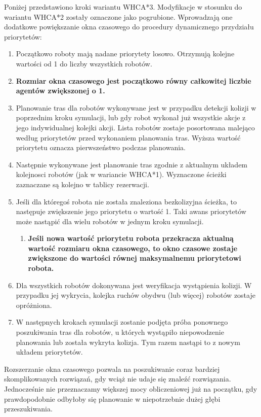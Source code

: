 Poniżej przedstawiono kroki wariantu WHCA*3. Modyfikacje w stosunku do wariantu WHCA*2 zostały oznaczone jako pogrubione. Wprowadzają one dodatkowe powiększanie okna czasowego do procedury dynamicznego przydziału priorytetów:
\begin{enumerate}
	\item Początkowo roboty mają nadane priorytety losowo. Otrzymują kolejne wartości od 1 do liczby wszystkich robotów.
	\item {\bf Rozmiar okna czasowego jest początkowo równy całkowitej liczbie agentów zwiększonej o 1.}
	\item Planowanie tras dla robotów wykonywane jest w przypadku detekcji kolizji w poprzednim kroku symulacji, lub gdy robot wykonał już wszystkie akcje z jego indywidualnej kolejki akcji.
	Lista robotów zostaje posortowana malejąco według priorytetów przed wykonaniem planowania tras. Wyższa wartość priorytetu oznacza pierwszeństwo podczas planowania.
	\item Następnie wykonywane jest planowanie tras zgodnie z aktualnym układem kolejnosci robotów (jak w wariancie WHCA*1). Wyznaczone ścieżki zaznaczane są kolejno w tablicy rezerwacji.
	\item Jeśli dla któregoś robota nie została znaleziona bezkolizyjna ścieżka, to następuje zwiększenie jego priorytetu o wartość 1. Taki awans priorytetów może nastąpić dla wielu robotów w jednym kroku symulacji.
	\begin{enumerate}
		\item {\bf Jeśli nowa wartość priorytetu robota przekracza aktualną wartość rozmiaru okna czasowego, to okno czasowe zostaje zwiększone do wartości równej maksymalnemu priorytetowi robota.}
	\end{enumerate}
	\item Dla wszystkich robotów dokonywana jest weryfikacja wystąpienia kolizji. W przypadku jej wykrycia, kolejka ruchów obydwu (lub więcej) robotów zostaje opróżniona.
	\item W następnych krokach symulacji zostanie podjęta próba ponownego poszukiwania tras dla robotów, u których wystąpiło niepowodzenie planowania lub została wykryta kolizja. Tym razem nastąpi to z nowym układem priorytetów.
\end{enumerate}

Rozszerzanie okna czasowego pozwala na poszukiwanie coraz bardziej skomplikowanych rozwiązań, gdy wciąż nie udaje się znaleźć rozwiązania. Jednocześnie nie przeznaczamy większej mocy obliczeniowej już na początku, gdy prawdopodobnie odbyłoby się planowanie w niepotrzebnie dużej głębi przeszukiwania.


